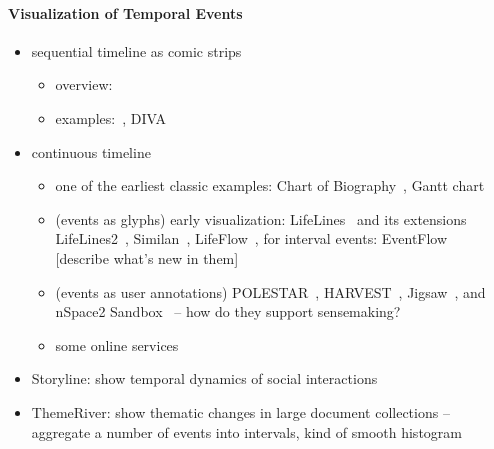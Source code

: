 \paragraph{Visualization of Temporal Events}
\begin{itemize}
	\item sequential timeline as comic strips
	\begin{itemize}
		\item overview: ~\cite{McCloud1993}
		\item  examples:~\cite{Gotz2010}, DIVA~\cite{Walker2013}
	\end{itemize}
	\item continuous timeline
	\begin{itemize}
		\item one of the earliest classic examples: Chart of Biography~\cite{Priestley1765}, Gantt chart~\cite{Gantt1913}
		\item (events as glyphs) early visualization: LifeLines~\cite{Plaisant1996, Plaisant1998} and its extensions LifeLines2~\cite{Wang2008, Wang2009}, Similan~\cite{Wongsuphasawat2009}, LifeFlow~\cite{Wongsuphasawat2011}, for interval events: EventFlow~\cite{Monroe2013} [describe what's new in them]
		\item (events as user annotations) POLESTAR~\cite{Pioch2006}, HARVEST~\cite{Gotz2006}, Jigsaw~\cite{Stasko2007, Gorg2013}, and nSpace2 Sandbox~\cite{Wright2006, SandboxTimeline2012} -- how do they support sensemaking?
		\item some online services
	\end{itemize}
	\item Storyline: show temporal dynamics of social interactions~\cite{Munroe2009, Tanahashi2012, Liu2013}
	\item ThemeRiver: show thematic changes in large document collections -- aggregate a number of events into intervals, kind of smooth histogram~\cite{Havre2002, Byron2008}
\end{itemize}

